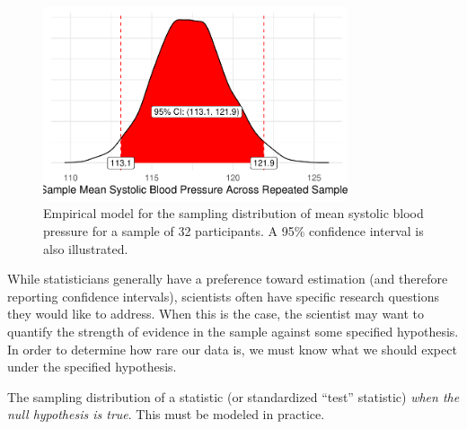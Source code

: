 \documentclass[
  letterpaper,
  DIV=11,
  numbers=noendperiod]{scrreprt}
\theoremstyle{definition}
\theoremstyle{definition}
\theoremstyle{remark}
\begin{document}
\begin{figure}

{\centering \includegraphics[width=0.8\textwidth,height=\textheight]{./images/fig-distributional-quartet-sampling-distribution-1.pdf}

}

\caption{\label{fig-distributional-quartet-sampling-distribution}Empirical
model for the sampling distribution of mean systolic blood pressure for
a sample of 32 participants. A 95\% confidence interval is also
illustrated.}

\end{figure}

While statisticians generally have a preference toward estimation (and
therefore reporting confidence intervals), scientists often have
specific research questions they would like to address. When this is the
case, the scientist may want to quantify the strength of evidence in the
sample against some specified hypothesis. In order to determine how rare
our data is, we must know what we should expect under the specified
hypothesis.

\begin{tcolorbox}[enhanced jigsaw, bottomrule=.15mm, titlerule=0mm, bottomtitle=1mm, colback=white, coltitle=black, rightrule=.15mm, leftrule=.75mm, toprule=.15mm, toptitle=1mm, left=2mm, opacityback=0, colframe=quarto-callout-important-color-frame, breakable, title=\textcolor{quarto-callout-important-color}{\faExclamation}\hspace{0.5em}{Null Distribution}, arc=.35mm, colbacktitle=quarto-callout-important-color!10!white, opacitybacktitle=0.6]

The sampling distribution of a statistic (or standardized ``test''
statistic) \emph{when the null hypothesis is true}. This must be modeled
in practice.

\end{tcolorbox}
\end{document}
